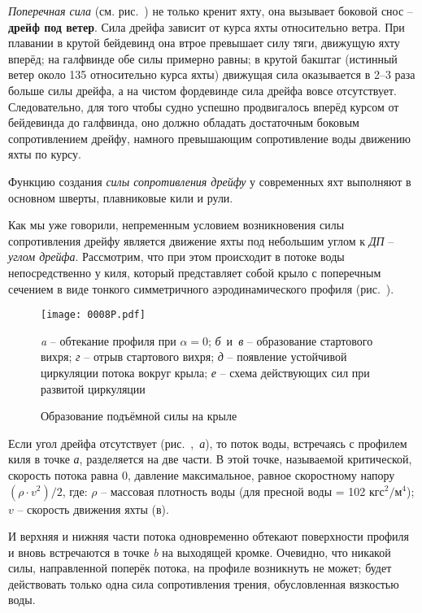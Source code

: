 \textit{Поперечная сила}  (см. рис.~)
не только кренит яхту, она вызывает боковой снос \---
\textbf{дрейф под ветер}. Сила дрейфа зависит от курса яхты
относительно ветра. При плавании в крутой бейдевинд она втрое
превышает силу тяги, движущую яхту вперёд; на галфвинде обе силы
примерно равны; в крутой бакштаг (истинный ветер около 135\gr
относительно курса яхты) движущая сила оказывается в 2--3 раза больше
силы дрейфа, а на чистом фордевинде сила дрейфа вовсе
отсутствует. Следовательно, для того чтобы судно успешно продвигалось
вперёд курсом от бейдевинда до галфвинда, оно должно обладать
достаточным боковым сопротивлением дрейфу, намного превышающим
сопротивление воды движению яхты по курсу.

Функцию создания \textit{силы сопротивления дрейфу}
у современных яхт выполняют в основном шверты, плавниковые кили и рули.

Как мы уже говорили, непременным условием возникновения силы
сопротивления дрейфу является движение яхты под небольшим углом к
\textit{ДП} \--- \textit{углом дрейфа}. Рассмотрим, что при этом происходит в
потоке воды непосредственно у киля, который представляет собой крыло с
поперечным сечением в виде тонкого симметричного аэродинамического
профиля (рис.~).

\begin{figure*}[htb]
  \centering
  \texttt{[image: 0008P.pdf]}
  \caption{Образование подъёмной силы на крыле}
  \label{fig:8}
  \centering{}\small \textit{a} \--- обтекание профиля при $\alpha = 0$;
                     \textit{б}~и~\textit{в} \--- образование стартового вихря;
                     \textit{г} \--- отрыв стартового вихря;
                     \textit{д} \--- появление устойчивой циркуляции потока вокруг крыла;
                     \textit{е} \--- схема действующих сил при развитой циркуляции
\end{figure*}

Если угол дрейфа отсутствует (рис.~,~\textit{а}), то поток
воды, встречаясь с профилем киля в точке \textit{а}, разделяется на
две части. В этой точке, называемой критической, скорость потока равна
0, давление максимальное, равное скоростному напору
$(\rho \cdot v^2) / 2$, где: $\rho$ \--- массовая плотность воды (для
пресной воды = 102 $\text{кгс}^2 / \text{м}^4$); $v$ \--- скорость
движения яхты (в\speedms).

И верхняя и нижняя части потока одновременно обтекают поверхности
профиля и вновь встречаются в точке \textit{b} на выходящей
кромке. Очевидно, что никакой силы, направленной поперёк потока, на
профиле возникнуть не может; будет действовать только одна сила
сопротивления трения, обусловленная вязкостью воды.

